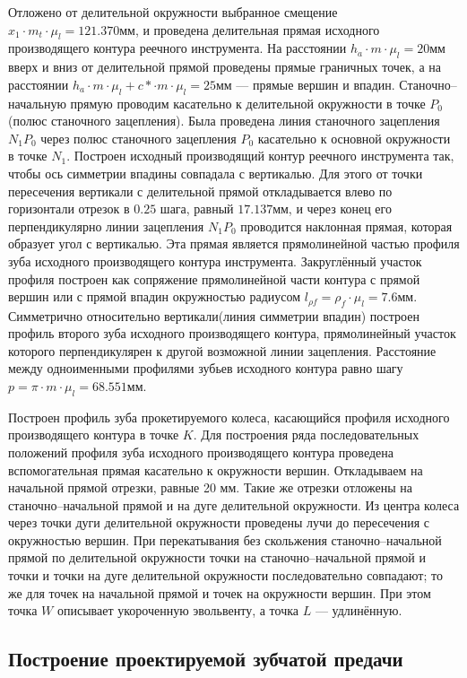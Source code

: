 Отложено от делительной окружности выбранное смещение $x_1 \cdot m_t \cdot \mu_l = 121.370 мм$, и проведена делительная прямая исходного производящего контура реечного инструмента. На расстоянии $h_a \cdot m \cdot \mu_l = 20 мм$ вверх и вниз от делительной прямой проведены прямые граничных точек, а на расстоянии $h_a \cdot m \cdot \mu_l + c* \cdot m \cdot \mu_l = 25мм$ --- прямые вершин и впадин. Станочно--начальную прямую проводим касательно к делительной окружности в точке $P_0$(полюс станочного зацепления). Была проведена линия станочного зацепления $N_1 P_0$ через полюс станочного зацепления $P_0$ касательно к основной окружности в точке $N_1$. Построен исходный производящий контур реечного инструмента так, чтобы ось симметрии впадины совпадала с вертикалью. Для этого от точки пересечения вертикали с делительной прямой откладывается влево по горизонтали отрезок в $0.25$ шага, равный $17.137$мм, и через конец его перпендикулярно линии зацепления $N_1 P_0$ проводится наклонная прямая, которая образует угол с вертикалью. Эта прямая является прямолинейной частью профиля зуба исходного производящего контура инструмента. Закруглённый участок профиля построен как сопряжение прямолинейной части контура с прямой вершин или с прямой впадин окружностью радиусом $l_{\rho f} = \rho_f \cdot \mu_l = 7.6 мм$. Симметрично относительно вертикали(линия симметрии впадин) построен профиль второго зуба исходного производящего контура, прямолинейный участок которого перпендикулярен к другой возможной линии зацепления. Расстояние между одноименными профилями зубьев исходного контура равно шагу $p = \pi \cdot m \cdot \mu_l = 68.551 мм$. 

Построен профиль зуба прокетируемого колеса, касающийся профиля исходного производящего контура в точке $K$. Для построения ряда последовательных положений профиля зуба исходного производящего контура проведена вспомогательная прямая касательно к окружности вершин. Откладываем на начальной прямой отрезки, равные 20 мм. Такие же отрезки отложены на станочно--начальной прямой и на дуге делительной окружности. Из центра колеса через точки дуги делительной окружности проведены лучи до пересечения с окружностью вершин. При перекатывания без скольжения станочно--начальной прямой по делительной окружности точки на станочно--начальной прямой и точки  и точки на дуге делительной окружности последовательно совпадают; то же для точек на начальной прямой и точек на окружности вершин. При этом точка $W$ описывает укороченную эвольвенту, а точка $L$ --- удлинённую.

\subsection{Построение проектируемой зубчатой предачи}

